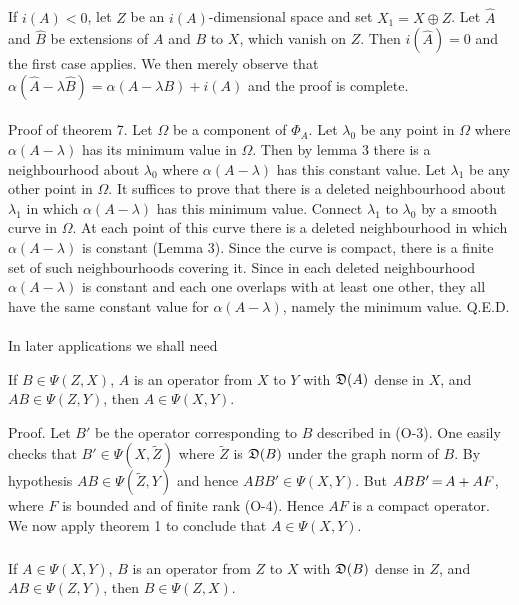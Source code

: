 \documentclass[11pt,twoside]{article}
\begin{document}
\subparagraph*{}
If $i(A) < 0$, let $Z$ be an $i(A)$-dimensional space
and set $X_1 = X \oplus Z$.
Let $\hat{A}$ and $\hat{B}$ be extensions of $A$ and $B$ to $X$,
which vanish on $Z$.
Then $i(\hat{A}) = 0$ and the first case applies.
We then merely observe that
$\alpha(\hat{A} - \lambda \hat{B}) = \alpha(A-\lambda B) + i(A)$
and the proof is complete.

\paragraph*{}
Proof of theorem 7.
Let $\Omega$ be a component of $\Phi_A$.
Let $\lambda_0$ be any point in $\Omega$
where $\alpha(A-\lambda)$ has its minimum value in $\Omega$.
Then by lemma 3 there is a neighbourhood about $\lambda_0$
where $\alpha(A-\lambda)$ has this constant value.
Let $\lambda_1$ be any other point in $\Omega$.
It suffices to prove that there is a deleted neighbourhood about
$\lambda_1$ in which $\alpha(A-\lambda)$ has this minimum value.
Connect $\lambda_1$ to $\lambda_0$ by a smooth curve in $\Omega$.
At each point of this curve there is a deleted neighbourhood
in which $\alpha(A-\lambda)$ is constant (Lemma 3).
Since the curve is compact,
there is a finite set of such neighbourhoods covering it.
Since in each deleted neighbourhood $\alpha(A-\lambda)$ is constant
and each one overlaps with at least one other,
they all have the same constant value for $\alpha(A-\lambda)$,
namely the minimum value.
Q.E.D.

\paragraph*{}
In later applications we shall need

\begin{lemma} %
If $B \in \Psi(Z,X)$, $A$ is an operator from $X$ to $Y$
with $\mathfrak{D}(A)$ dense in $X$,
and $AB \in \Psi(Z,Y)$, then $A \in \Psi(X,Y)$.
\end{lemma}

Proof.
Let $B'$ be the operator corresponding to $B$ described in (O-3).
One easily checks that $B' \in \Psi(X,\tilde{Z})$
where $\tilde{Z}$ is $\mathfrak{D}(B)$ under the graph norm of $B$.
By hypothesis $AB \in \Psi(\tilde{Z},Y)$ and hence $ABB' \in \Psi(X,Y)$.
But $ABB' {\,=\,} A+AF$,
where $F$ is bounded and of finite rank (O-4).
Hence $AF$ is a compact operator.
We now apply theorem 1 to conclude that $A \in \Psi(X,Y)$.

\subparagraph*{}
\begin{lemma} %
If $A \in \Psi(X,Y)$, $B$ is an operator from $Z$ to $X$
with $\mathfrak{D}(B)$ dense in $Z$, and $AB \in \Psi(Z,Y)$,
then $B \in \Psi(Z,X)$.
\end{lemma}
\end{document}
